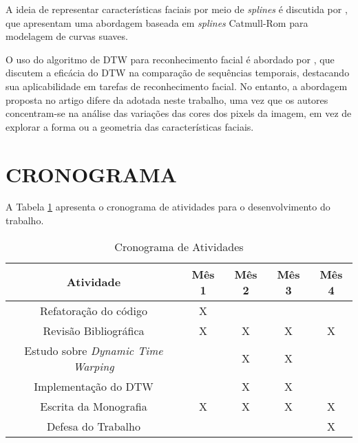 A ideia de representar características faciais por meio de \textit{splines} é discutida por \citet{RepresentationSplines}, que apresentam uma abordagem baseada em \textit{splines} Catmull-Rom para modelagem de curvas suaves. 

O uso do algoritmo de DTW para reconhecimento facial é abordado por \citet{DTW_LSTM}, que discutem a eficácia do DTW na comparação de sequências temporais, destacando sua aplicabilidade em tarefas de reconhecimento facial. No entanto, a abordagem proposta no artigo difere da adotada neste trabalho, uma vez que os autores concentram-se na análise das variações das cores dos pixels da imagem, em vez de explorar a forma ou a geometria das características faciais.

\section{CRONOGRAMA}

A Tabela \ref{tab:crono} apresenta o cronograma de atividades para o desenvolvimento do trabalho.

\begin{table}[ht] 
    \centering
    \caption{Cronograma de Atividades}
    \label{tab:crono}
    \begin{tabular}{|c|c|c|c|c|}
    \hline
    \textbf{Atividade} & \textbf{Mês 1} & \textbf{Mês 2} & \textbf{Mês 3} & \textbf{Mês 4} \\ \hline
    Refatoração do código & X &  &  & \\ \hline
    Revisão Bibliográfica &  X & X & X & X \\ \hline
    Estudo sobre \textit{Dynamic Time Warping} &  & X & X & \\ \hline
    Implementação do DTW &  & X & X & \\ \hline
    Escrita da Monografia & X & X & X & X \\ \hline
    Defesa do Trabalho &  &  &  &  X\\ \hline
    \end{tabular}
\end{table}
